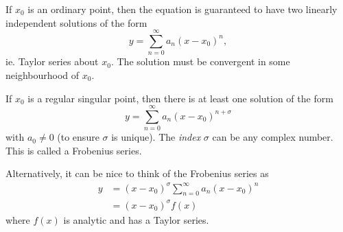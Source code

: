 \documentclass[a4paper]{article}
\begin{document}
  If $x_0$ is an ordinary point, then the equation is guaranteed to have two linearly independent solutions of the form 
  \[
    y = \sum_{n = 0}^\infty a_n(x - x_0)^n,
  \]
  ie. Taylor series about $x_0$. The solution must be convergent in some neighbourhood of $x_0$.

  If $x_0$ is a regular singular point, then there is at least one solution of the form 
  \[
    y = \sum_{n = 0}^\infty a_n(x - x_0)^{n + \sigma}
  \]
  with $a_0 \not= 0$ (to ensure $\sigma$ is unique). The \emph{index} $\sigma$ can be any complex number. This is called a Frobenius series.

  Alternatively, it can be nice to think of the Frobenius series as 
  \begin{align*}
    y &= (x - x_0)^\sigma \sum_{n = 0}^\infty a_n (x - x_0)^n\\
    &= (x-x_0)^\sigma f(x)
  \end{align*}
  where $f(x)$ is analytic and has a Taylor series.
\end{document}
